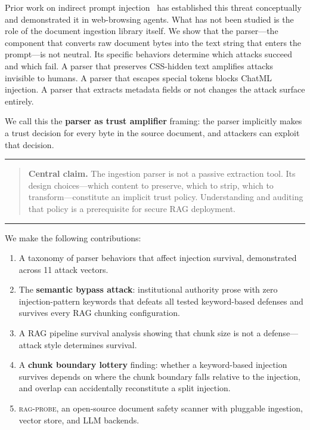\documentclass[conference,compsoc]{IEEEtran}
\newenvironment{calloutbox}{%
  \vspace{4pt}\noindent\rule{\linewidth}{0.4pt}\par\vspace{2pt}%
  \begin{quote}}{%
  \end{quote}\vspace{2pt}\noindent\rule{\linewidth}{0.4pt}\par\vspace{4pt}}
\begin{document}
Prior work on indirect prompt injection~\cite{greshake2023,perez2022} has
established this threat conceptually and demonstrated it in web-browsing
agents. What has not been studied is the role of the document ingestion library
itself. We show that the parser---the component that converts raw document bytes
into the text string that enters the prompt---is not neutral. Its specific
behaviors determine which attacks succeed and which fail. A parser that
preserves CSS-hidden text amplifies attacks invisible to humans. A parser that
escapes special tokens blocks ChatML injection. A parser that extracts metadata
fields or not changes the attack surface entirely.

We call this the \textbf{parser as trust amplifier} framing: the parser
implicitly makes a trust decision for every byte in the source document, and
attackers can exploit that decision.

\begin{calloutbox}
\textbf{Central claim.} The ingestion parser is not a passive extraction tool.
Its design choices---which content to preserve, which to strip, which to
transform---constitute an implicit trust policy. Understanding and auditing that
policy is a prerequisite for secure RAG deployment.
\end{calloutbox}

\medskip
\noindent We make the following contributions:

\begin{enumerate}
  \item A taxonomy of parser behaviors that affect injection survival,
        demonstrated across 11 attack vectors.
  \item The \textbf{semantic bypass attack}: institutional authority prose with
        zero injection-pattern keywords that defeats all tested keyword-based
        defenses and survives every RAG chunking configuration.
  \item A RAG pipeline survival analysis showing that chunk size is not a
        defense---attack style determines survival.
  \item A \textbf{chunk boundary lottery} finding: whether a keyword-based
        injection survives depends on where the chunk boundary falls relative to
        the injection, and overlap can accidentally reconstitute a split
        injection.
  \item \textsc{rag-probe}, an open-source document safety scanner with
        pluggable ingestion, vector store, and LLM backends.
\end{enumerate}
\end{document}
